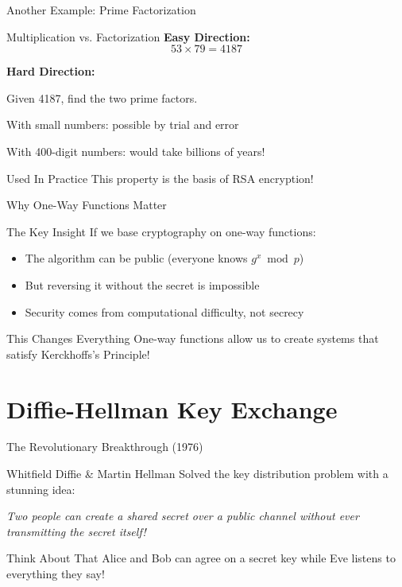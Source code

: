 \documentclass{beamer}
\begin{document}
\begin{frame}{Another Example: Prime Factorization}
\begin{block}{Multiplication vs. Factorization}
\textbf{Easy Direction:}
\[
53 \times 79 = 4187
\]

\pause

\textbf{Hard Direction:}

Given 4187, find the two prime factors.

\pause

With small numbers: possible by trial and error

With 400-digit numbers: would take billions of years!
\end{block}

\pause

\begin{exampleblock}{Used In Practice}
This property is the basis of RSA encryption!
\end{exampleblock}
\end{frame}

\begin{frame}{Why One-Way Functions Matter}
\begin{block}{The Key Insight}
If we base cryptography on one-way functions:
\begin{itemize}
    \item The algorithm can be public (everyone knows $g^x \bmod p$)
    \item But reversing it without the secret is impossible
    \item Security comes from computational difficulty, not secrecy
\end{itemize}
\end{block}

\pause

\begin{alertblock}{This Changes Everything}
One-way functions allow us to create systems that satisfy Kerckhoffs's Principle!
\end{alertblock}
\end{frame}

\section{Diffie-Hellman Key Exchange}

\begin{frame}{The Revolutionary Breakthrough (1976)}
\begin{block}{Whitfield Diffie \& Martin Hellman}
Solved the key distribution problem with a stunning idea:

\vspace{0.3cm}

\textit{Two people can create a shared secret over a public channel without ever transmitting the secret itself!}
\end{block}

\pause

\begin{alertblock}{Think About That}
Alice and Bob can agree on a secret key while Eve listens to everything they say!
\end{alertblock}
\end{frame}
\end{document}

